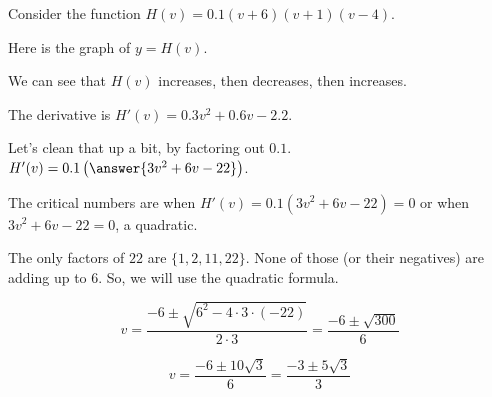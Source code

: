 \documentclass{ximera}
\begin{document}
\begin{example}

Consider the function $H(v) = 0.1(v+6)(v+1)(v-4)$.

Here is the graph of $y = H(v)$.








\begin{image}
\end{image}




We can see that $H(v)$ increases, then decreases, then increases.  


The derivative is $H'(v) = 0.3 v^2 + 0.6 v - 2.2$. 

Let's clean that up a bit, by factoring out $0.1$. $H'(v) = 0.1 \left( \answer{3 v^2 + 6 v - 22} \right)$. 



The critical numbers are when $H'(v) = 0.1(3 v^2 + 6 v - 22) =0$ or when $3 v^2 + 6 v - 22 =0$,   a quadratic. 


The only factors of $22$ are $\{ 1, 2, 11, 22    \}$.  None of those (or their negatives) are adding up to $6$.  So, we will use the quadratic formula.



\[  v = \frac{-6 \pm \sqrt{6^2 - 4 \cdot 3 \cdot (-22)}}{2 \cdot 3}  = \frac{-6 \pm \sqrt{300}}{6}    \]


\[  v = \frac{-6 \pm 10\sqrt{3}}{6}  =  \frac{-3 \pm 5\sqrt{3}}{3} \]




\end{example}
\end{document}
